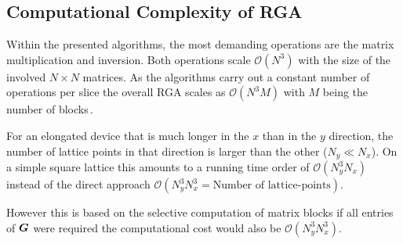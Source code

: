 \subsection{Computational Complexity of RGA}\label{sec:rgacomplexity}
Within the presented algorithms, the most demanding operations are the matrix multiplication and inversion. Both operations scale $\mathcal{O}(N^3)$ with the size of the involved $N \times N$ matrices. As the algorithms carry out a constant number of operations per slice the overall RGA scales as $\mathcal{O}(N^3M)$ with $M$ being the number of blocks\,\cite{Li2009Thesis}.\par
For an elongated device that is much longer in the $x$ than in the $y$ direction, the number of lattice points in that direction is larger than the other ($N_y \ll N_x$). On a simple square lattice this amounts to a running time order of $\mathcal{O}(N_y^3N_x)$  instead of the direct approach $\mathcal{O}(N_y^3N_x^3=\text{Number of lattice-points})$.\par
However this is based on the selective computation of matrix blocks if all entries of $\boldsymbol{G}$ were required the computational cost would also be $\mathcal{O}(N_y^3N_x^3)$.
\FloatBarrier
